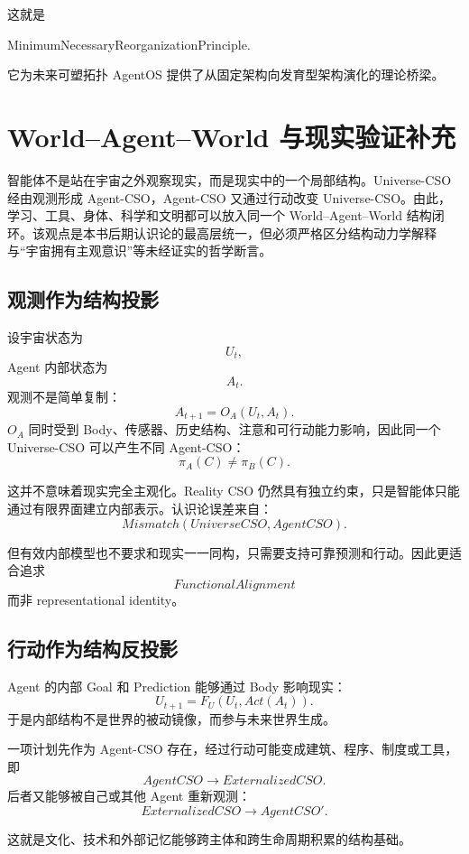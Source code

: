这就是
\begin{statementbox}
MinimumNecessaryReorganizationPrinciple.
\end{statementbox}
它为未来可塑拓扑 AgentOS 提供了从固定架构向发育型架构演化的理论桥梁。


\chapter{World--Agent--World 与现实验证补充}
\label{app:world_agent}

\begin{chapterlead}
智能体不是站在宇宙之外观察现实，而是现实中的一个局部结构。Universe-CSO 经由观测形成 Agent-CSO，Agent-CSO 又通过行动改变 Universe-CSO。由此，学习、工具、身体、科学和文明都可以放入同一个 World--Agent--World 结构闭环。该观点是本书后期认识论的最高层统一，但必须严格区分结构动力学解释与“宇宙拥有主观意识”等未经证实的哲学断言。
\end{chapterlead}

\section{观测作为结构投影}

设宇宙状态为
\[
U_t,
\]
Agent 内部状态为
\[
A_t.
\]
观测不是简单复制：
\[
A_{t+1}
=
O_A(U_t,A_t).
\]
$O_A$ 同时受到 Body、传感器、历史结构、注意和可行动能力影响，因此同一个 Universe-CSO 可以产生不同 Agent-CSO：
\[
\pi_A(C)\neq\pi_B(C).
\]

这并不意味着现实完全主观化。Reality CSO 仍然具有独立约束，只是智能体只能通过有限界面建立内部表示。认识论误差来自：
\[
Mismatch(
UniverseCSO,
AgentCSO
).
\]

但有效内部模型也不要求和现实一一同构，只需要支持可靠预测和行动。因此更适合追求
\[
FunctionalAlignment
\]
而非 representational identity。

\section{行动作为结构反投影}

Agent 的内部 Goal 和 Prediction 能够通过 Body 影响现实：
\[
U_{t+1}
=
F_U(U_t,Act(A_t)).
\]
于是内部结构不是世界的被动镜像，而参与未来世界生成。

一项计划先作为 Agent-CSO 存在，经过行动可能变成建筑、程序、制度或工具，即
\[
AgentCSO
\rightarrow
ExternalizedCSO.
\]
后者又能够被自己或其他 Agent 重新观测：
\[
ExternalizedCSO
\rightarrow
AgentCSO'.
\]

这就是文化、技术和外部记忆能够跨主体和跨生命周期积累的结构基础。

